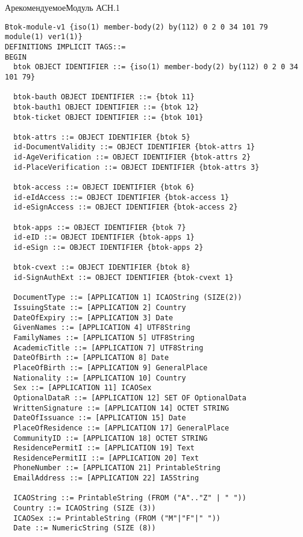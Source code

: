 \begin{appendix}{А}{рекомендуемое}{Модуль АСН.1}
\label{ASN.modul}


\begin{verbatim}
Btok-module-v1 {iso(1) member-body(2) by(112) 0 2 0 34 101 79 module(1) ver1(1)}
DEFINITIONS IMPLICIT TAGS::=
BEGIN
  btok OBJECT IDENTIFIER ::= {iso(1) member-body(2) by(112) 0 2 0 34 101 79}

  btok-bauth OBJECT IDENTIFIER ::= {btok 11}
  btok-bauth1 OBJECT IDENTIFIER ::= {btok 12}
  btok-ticket OBJECT IDENTIFIER ::= {btok 101}

  btok-attrs ::= OBJECT IDENTIFIER {btok 5}
  id-DocumentValidity ::= OBJECT IDENTIFIER {btok-attrs 1}
  id-AgeVerification ::= OBJECT IDENTIFIER {btok-attrs 2}
  id-PlaceVerification ::= OBJECT IDENTIFIER {btok-attrs 3}

  btok-access ::= OBJECT IDENTIFIER {btok 6}
  id-eIdAccess ::= OBJECT IDENTIFIER {btok-access 1}
  id-eSignAccess ::= OBJECT IDENTIFIER {btok-access 2}

  btok-apps ::= OBJECT IDENTIFIER {btok 7}
  id-eID ::= OBJECT IDENTIFIER {btok-apps 1}
  id-eSign ::= OBJECT IDENTIFIER {btok-apps 2}

  btok-cvext ::= OBJECT IDENTIFIER {btok 8}
  id-SignAuthExt ::= OBJECT IDENTIFIER {btok-cvext 1}

  DocumentType ::= [APPLICATION 1] ICAOString (SIZE(2))
  IssuingState ::= [APPLICATION 2] Country
  DateOfExpiry ::= [APPLICATION 3] Date
  GivenNames ::= [APPLICATION 4] UTF8String
  FamilyNames ::= [APPLICATION 5] UTF8String
  AcademicTitle ::= [APPLICATION 7] UTF8String
  DateOfBirth ::= [APPLICATION 8] Date
  PlaceOfBirth ::= [APPLICATION 9] GeneralPlace
  Nationality ::= [APPLICATION 10] Country
  Sex ::= [APPLICATION 11] ICAOSex
  OptionalDataR ::= [APPLICATION 12] SET OF OptionalData
  WrittenSignature ::= [APPLICATION 14] OCTET STRING
  DateOfIssuance ::= [APPLICATION 15] Date
  PlaceOfResidence ::= [APPLICATION 17] GeneralPlace
  CommunityID ::= [APPLICATION 18] OCTET STRING
  ResidencePermitI ::= [APPLICATION 19] Text
  ResidencePermitII ::= [APPLICATION 20] Text
  PhoneNumber ::= [APPLICATION 21] PrintableString
  EmailAddress ::= [APPLICATION 22] IA5String
  
  ICAOString ::= PrintableString (FROM ("A".."Z" | " "))
  Country ::= ICAOString (SIZE (3))
  ICAOSex ::= PrintableString (FROM ("M"|"F"|" "))
  Date ::= NumericString (SIZE (8))
  

\end{verbatim}
\end{appendix}
